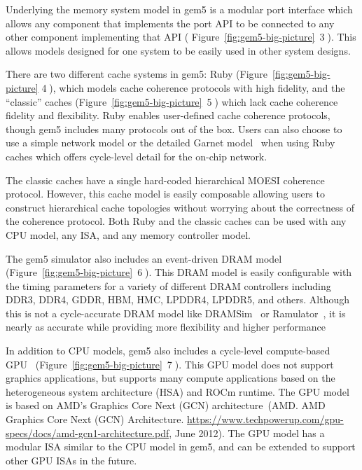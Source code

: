 Underlying the memory system model in gem5 is a modular port interface which allows any component that implements the port API to be connected to any other component implementing that API ( Figure~\ref{fig:gem5-big-picture}~\textcircled{3}).
This allows models designed for one system to be easily used in other system designs.

There are two different cache systems in gem5: Ruby (Figure~\ref{fig:gem5-big-picture} \textcircled{4}), which models cache coherence protocols with high fidelity, and the ``classic'' caches (Figure~\ref{fig:gem5-big-picture}~\textcircled{5}) which lack cache coherence fidelity and flexibility.
Ruby enables user-defined cache coherence protocols, though gem5 includes many protocols out of the box.
Users can also choose to use a simple network model or the detailed Garnet model~\cite{garnet-2} when using Ruby caches which offers cycle-level detail for the on-chip network.

The classic caches have a single hard-coded hierarchical MOESI coherence protocol.
However, this cache model is easily composable allowing users to construct hierarchical cache topologies without worrying about the correctness of the coherence protocol.
Both Ruby and the classic caches can be used with any CPU model, any ISA, and any memory controller model.

The gem5 simulator also includes an event-driven DRAM model (Figure~\ref{fig:gem5-big-picture}~\textcircled{6}).
This DRAM model is easily configurable with the timing parameters for a variety of different DRAM controllers including DDR3, DDR4, GDDR, HBM, HMC, LPDDR4, LPDDR5, and others.
Although this is not a cycle-accurate DRAM model like DRAMSim~\cite{dramsim, dramsim2, dramsim3} or Ramulator~\cite{ramulator}, it is nearly as accurate while providing more flexibility and higher performance~\cite{hansson-ispass-paper}

In addition to CPU models, gem5 also includes a cycle-level compute-based GPU~\cite{} (Figure~\ref{fig:gem5-big-picture}~\textcircled{7}).
This GPU model does not support graphics applications, but supports many compute applications based on the heterogeneous system architecture (HSA) and ROCm runtime.
The GPU model is based on AMD's Graphics Core Next (GCN) architecture~\cite{}(AMD. AMD Graphics Core Next (GCN) Architecture. \url{https://www.techpowerup.com/gpu-specs/docs/amd-gcn1-architecture.pdf}, June 2012).
The GPU model has a modular ISA similar to the CPU model in gem5, and can be extended to support other GPU ISAs in the future.

